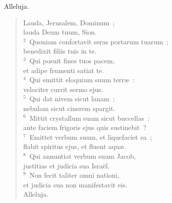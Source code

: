 \lettrine[lines=3,image=true,loversize=0.05,lraise=-0.03]{A}{}lleluja. \begin{flushleft}\begin{verse}\vspace{6pt}Lauda, Jerusalem, Dominum~;\\ lauda Deum tuum, Sion.\\
${}^{2}$~Quoniam confortavit seras portarum tuarum~;\\ benedixit filiis tuis in te.\\
${}^{3}$~Qui posuit fines tuos pacem,\\ et adipe frumenti satiat te.\\
${}^{4}$~Qui emittit eloquium suum terr\ae~:\\ velociter currit sermo ejus.\\
${}^{5}$~Qui dat nivem sicut lanam~;\\ nebulam sicut cinerem spargit.\\
${}^{6}$~Mittit crystallum suam sicut buccellas~:\\ ante faciem frigoris ejus quis sustinebit~?\\
${}^{7}$~Emittet verbum suum, et liquefaciet ea~;\\ flabit spiritus ejus, et fluent aqu\ae .\\
${}^{8}$~Qui annuntiat verbum suum Jacob,\\ justitias et judicia sua Isra\"el.\\
${}^{9}$~Non fecit taliter omni nationi,\\ et judicia sua non manifestavit eis.\\ Alleluja.\end{verse}\end{flushleft}



